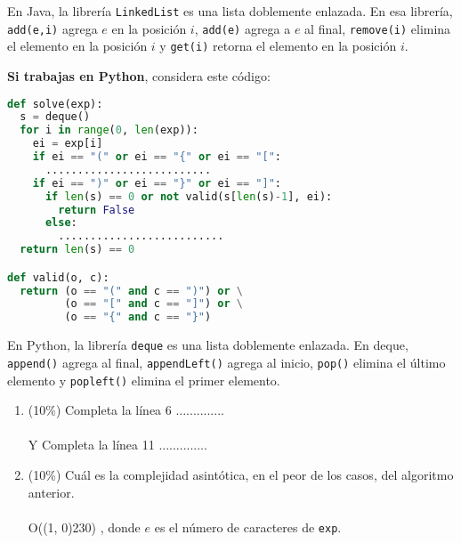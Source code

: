 \documentclass[10 pt]{article}
\begin{document}
En Java, la librería \texttt{LinkedList} es una lista
doblemente enlazada. En esa librería, \texttt{add(e,i)}
agrega $e$ en la posición $i$, \texttt{add(e)} agrega
a $e$ al final, \texttt{remove(i)} elimina el elemento
en la posición $i$ y \texttt{get(i)} retorna el elemento
en la posición $i$.


\hspace{1cm}

\textbf{Si trabajas en Python}, considera este código:

\begin{lstlisting}[language=Python]
def solve(exp):
  s = deque()
  for i in range(0, len(exp)):
    ei = exp[i]
    if ei == "(" or ei == "{" or ei == "[":
      ..........................
    if ei == ")" or ei == "}" or ei == "]":
      if len(s) == 0 or not valid(s[len(s)-1], ei):
        return False
      else:
        ..........................
  return len(s) == 0

def valid(o, c):
  return (o == "(" and c == ")") or \
         (o == "[" and c == "]") or \
         (o == "{" and c == "}")
\end{lstlisting}

En Python, la librería \texttt{deque} es una lista doblemente enlazada.
En deque, \texttt{append()} agrega al final, \texttt{appendLeft()} agrega
al inicio, \texttt{pop()} elimina el último elemento y \texttt{popleft()}
elimina el primer elemento.


\begin{enumerate}[label=(\Alph*)]
  \item (10\%) Completa la línea 6  ..............\\ \\
  Y Completa la línea 11 ..............
  \item (10\%) Cuál es la complejidad asintótica, en el peor de los casos, del algoritmo anterior. \\ \\
  O(\line(1, 0){230}) , donde $e$ es el número de caracteres de \texttt{exp}.
\end{enumerate}

\newpage
\end{document}
